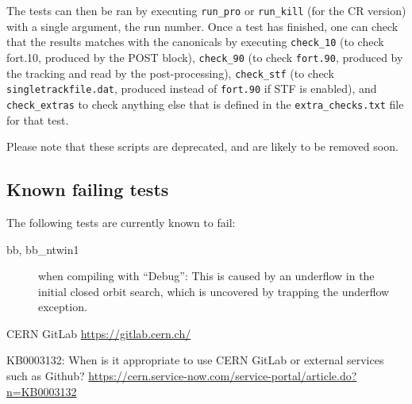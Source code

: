 \documentclass[english,BCOR=0mm,DIV=18]{scrartcl}
\begin{document}
The tests can then be ran by executing \texttt{run\_pro} or \texttt{run\_kill} (for the CR version) with a single argument, the run number.
Once a test has finished, one can check that the results matches with the canonicals by executing \texttt{check\_10} (to check fort.10, produced by the POST block), \texttt{check\_90} (to check \texttt{fort.90}, produced by the tracking and read by the post-processing), \texttt{check\_stf} (to check \texttt{singletrackfile.dat}, produced instead of \texttt{fort.90} if STF is enabled), and \texttt{check\_extras} to check anything else that is defined in the \texttt{extra\_checks.txt} file for that test.

Please note that these scripts are deprecated, and are likely to be removed soon.

\subsection{Known failing tests}
The following tests are currently known to fail:
\begin{description}
\item[bb, bb\_ntwin1] when compiling with ``Debug'': This is caused by an underflow in the initial closed orbit search, which is uncovered by trapping the underflow exception.
\end{description}

\begin{thebibliography}{2}

 CERN GitLab \url{https://gitlab.cern.ch/}

 KB0003132: When is it appropriate to use CERN GitLab or external services such as Github? \url{https://cern.service-now.com/service-portal/article.do?n=KB0003132}

\end{thebibliography}
\end{document}
